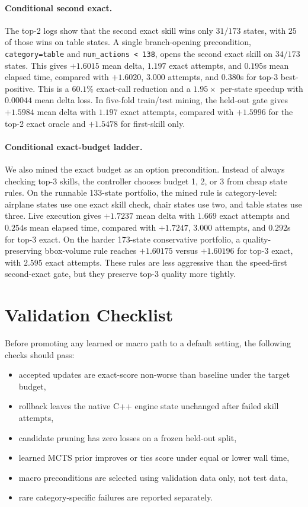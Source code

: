 \documentclass[10pt,twocolumn,letterpaper]{article}
\begin{document}
\paragraph{Conditional second exact.}
The top-2 logs show that the second exact skill wins only $31/173$ states, with
$25$ of those wins on table states.  A single branch-opening precondition,
\texttt{category=table} and \texttt{num\_actions < 138}, opens the second exact
skill on $34/173$ states.  This gives $+1.6015$ mean delta, $1.197$ exact
attempts, and $0.195$s mean elapsed time, compared with $+1.6020$, $3.000$
attempts, and $0.380$s for top-3 best-positive.  This is a $60.1\%$ exact-call
reduction and a $1.95\times$ per-state speedup with $0.00044$ mean delta loss.
In five-fold train/test mining, the held-out gate gives $+1.5984$ mean delta
with $1.197$ exact attempts, compared with $+1.5996$ for the top-2 exact oracle
and $+1.5478$ for first-skill only.

\paragraph{Conditional exact-budget ladder.}
We also mined the exact budget as an option precondition.  Instead of always
checking top-3 skills, the controller chooses budget 1, 2, or 3 from cheap state
rules.  On the runnable 133-state portfolio, the mined rule is category-level:
airplane states use one exact skill check, chair states use two, and table
states use three.  Live execution gives $+1.7237$ mean delta with $1.669$ exact
attempts and $0.254$s mean elapsed time, compared with $+1.7247$, $3.000$
attempts, and $0.292$s for top-3 exact.  On the harder 173-state conservative
portfolio, a quality-preserving bbox-volume rule reaches $+1.60175$ versus
$+1.60196$ for top-3 exact, with $2.595$ exact attempts.  These rules are less
aggressive than the speed-first second-exact gate, but they preserve top-3
quality more tightly.

\section{Validation Checklist}

Before promoting any learned or macro path to a default setting, the following
checks should pass:

\begin{itemize}
\item accepted updates are exact-score non-worse than baseline under the target
budget,
\item rollback leaves the native C++ engine state unchanged after failed skill
attempts,
\item candidate pruning has zero losses on a frozen held-out split,
\item learned MCTS prior improves or ties score under equal or lower wall time,
\item macro preconditions are selected using validation data only, not test
data,
\item rare category-specific failures are reported separately.
\end{itemize}
\end{document}
